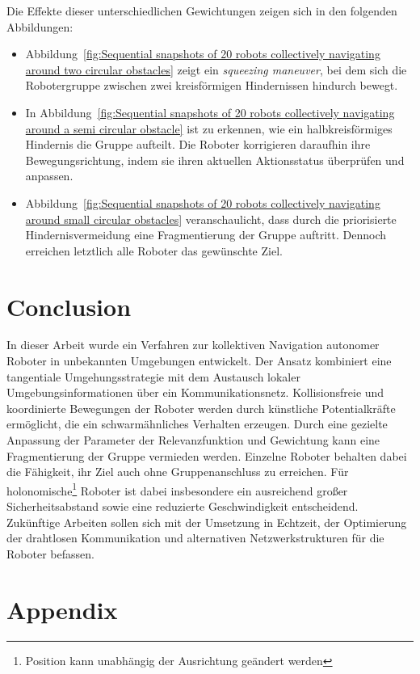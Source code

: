\documentclass[conference]{IEEEtran}
\begin{document}
Die Effekte dieser unterschiedlichen Gewichtungen zeigen sich in den folgenden Abbildungen:
\begin{itemize}
\item Abbildung~\ref{fig:Sequential snapshots of 20 robots collectively navigating around two circular obstacles} 
zeigt ein \textit{squeezing maneuver}, bei dem sich die 
Robotergruppe zwischen zwei kreisförmigen Hindernissen hindurch bewegt.
\item In Abbildung~\ref{fig:Sequential snapshots of 20 robots collectively navigating around a semi circular obstacle} 
ist zu erkennen, wie ein halbkreisförmiges Hindernis 
die Gruppe aufteilt. Die Roboter korrigieren daraufhin ihre Bewegungsrichtung, 
indem sie ihren aktuellen Aktionsstatus überprüfen und anpassen.
\item Abbildung~\ref{fig:Sequential snapshots of 20 robots collectively navigating around small circular obstacles} veranschaulicht, dass durch die priorisierte 
Hindernisvermeidung eine Fragmentierung der Gruppe auftritt. 
Dennoch erreichen letztlich alle Roboter das gewünschte Ziel.
\end{itemize}


\section{Conclusion}
In dieser Arbeit wurde ein Verfahren zur kollektiven Navigation autonomer Roboter 
in unbekannten Umgebungen entwickelt. Der Ansatz kombiniert eine tangentiale 
Umgehungsstrategie mit dem Austausch lokaler Umgebungsinformationen über ein 
Kommunikationsnetz. Kollisionsfreie und koordinierte Bewegungen der Roboter 
werden durch künstliche Potentialkräfte ermöglicht, die ein schwarmähnliches 
Verhalten erzeugen. Durch eine gezielte Anpassung der Parameter der 
Relevanzfunktion und Gewichtung kann eine Fragmentierung der Gruppe 
vermieden werden. Einzelne Roboter behalten dabei die Fähigkeit, ihr Ziel 
auch ohne Gruppenanschluss zu erreichen. Für holonomische\footnote{Position 
kann unabhängig der Ausrichtung geändert werden} Roboter ist dabei 
insbesondere ein ausreichend großer Sicherheitsabstand sowie eine reduzierte 
Geschwindigkeit entscheidend. Zukünftige Arbeiten sollen sich mit der 
Umsetzung in Echtzeit, der Optimierung der drahtlosen Kommunikation und 
alternativen Netzwerkstrukturen für die Roboter befassen.


\section*{Appendix}
\end{document}
